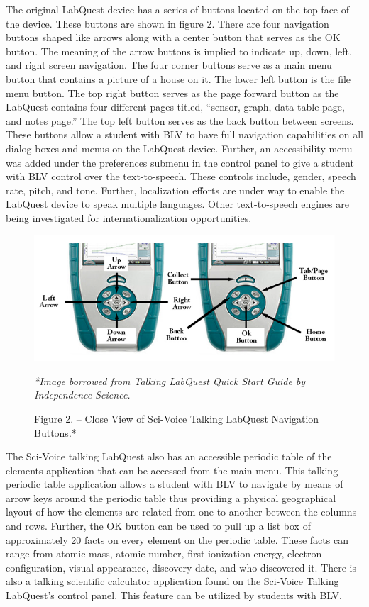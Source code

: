 \documentclass[11.5pt]{sig-alternate} %
\begin{document}
\begin{large}
The original LabQuest device has a series of buttons located on the top face of the device. These buttons are shown in figure 2. There are four navigation buttons shaped like arrows along with a center button that serves as the OK button. The meaning of the arrow buttons is implied to indicate up, down, left, and right screen navigation. The four corner buttons serve as a main menu button that contains a picture of a house on it. The lower left button is the file menu button. The top right button serves as the page forward button as the LabQuest contains four different pages titled, “sensor, graph, data table page, and notes page.” The top left button serves as the back button between screens. These buttons allow a student with BLV to have full navigation capabilities on all dialog boxes and menus on the LabQuest device. Further, an accessibility menu was added under the preferences submenu in the control panel to give a student with BLV control over the text-to-speech. These controls include, gender, speech rate, pitch, and tone. Further, localization efforts are under way to enable the LabQuest device to speak multiple languages. Other text-to-speech engines are being investigated for internationalization opportunities.

\begin{figure}[h]
    \includegraphics[width=1\linewidth]{images/fig2.png}
    \caption{Figure 2. – Close View of Sci-Voice Talking LabQuest Navigation Buttons.*}
    \begin{large}\textit{ *Image borrowed from Talking LabQuest Quick Start Guide by Independence Science.}\end{large}
\end{figure}

The Sci-Voice talking LabQuest also has an accessible periodic table of the elements application that can be accessed from the main menu. This talking periodic table application allows a student with BLV to navigate by means of arrow keys around the periodic table thus providing a physical geographical layout of how the elements are related from one to another between the columns and rows. Further, the OK button can be used to pull up a list box of approximately 20 facts on every element on the periodic table. These facts can range from atomic mass, atomic number, first ionization energy, electron configuration, visual appearance, discovery date, and who discovered it. There is also a talking scientific calculator application found on the Sci-Voice Talking LabQuest’s control panel. This feature can be utilized by students with BLV. 


\end{large}
\end{document}
